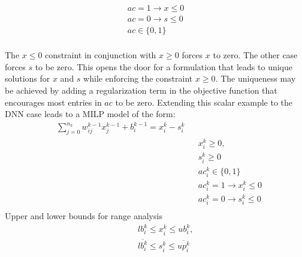 \begin{equation}
\begin{aligned}
ac = 1 \rightarrow x \leq 0  \\
ac = 0 \rightarrow s \leq 0  \\
ac \in \{0,1\} \\
\end{aligned}
\end{equation}

The $x \leq 0$ constraint in conjunction with $x \geq 0$ forces $x$ to zero. The other case forces $s$ to be zero.
This opens the door for a formulation that leads to unique solutions for $x$ and $s$ while enforcing the constraint $x \geq 0$.
The uniqueness may be achieved by adding a regularization term in the objective function that encourages most entries in $ac$ to be zero.
Extending this scalar example to the DNN case leads to a \ac{MILP} model of the form:
\begin{equation}
\begin{aligned}
& \sum_{j=0}^{n_k} w_{ij}^{k-1}x_{j}^{k-1} + b_i^{k-1} = x_i^k - s_i^k  \\
& & & x_i^k \geq 0, \\
& & & s_i^k \geq 0 \\
& & & ac_i^k  \in  \{0,1\} \\
& & & ac_i^k  =  1 \rightarrow  x_i^k \leq 0  \\
& & & ac_i^k =  0 \rightarrow s_i^k  \leq 0   \\
\end{aligned}
\end{equation}
Upper and lower bounds for range analysis
\begin{equation}
\begin{aligned}
& & & lb_i^k \leq x_i^k \leq ub_i^k, \\
& & &  \overline{lb_i^k} \leq s_i^k \leq \overline{up_i^k} \\
\end{aligned}
\end{equation}

